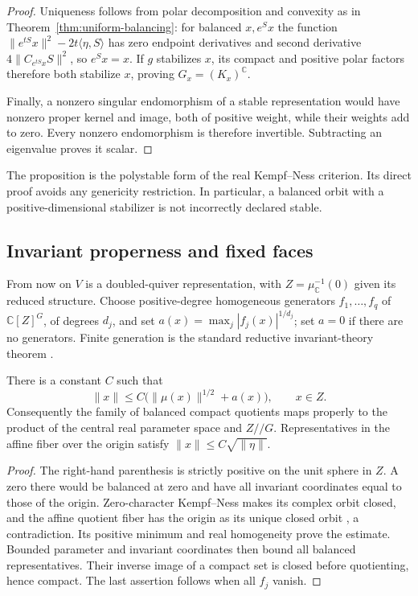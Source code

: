 \begin{proof}
Uniqueness follows from polar decomposition and convexity as in
Theorem~\ref{thm:uniform-balancing}: for balanced $x,e^Sx$ the function
$\|e^{tS}x\|^2-2t\langle\eta,S\rangle$ has zero endpoint derivatives
and second derivative $4\|C_{e^{tS}x}S\|^2$, so $e^Sx=x$.
If $g$ stabilizes $x$, its compact and positive polar factors
therefore both stabilize $x$, proving $G_x=(K_x)^{\mathbb C}$.

Finally, a nonzero singular endomorphism of a stable representation
would have nonzero proper kernel and image, both of positive weight,
while their weights add to zero. Every nonzero endomorphism is
therefore invertible. Subtracting an eigenvalue proves it scalar.
\end{proof}

The proposition is the polystable form of the real Kempf--Ness
criterion. Its direct proof avoids any genericity restriction.
In particular, a balanced orbit with a positive-dimensional stabilizer
is not incorrectly declared stable.

\subsection{Invariant properness and fixed faces}
From now on $V$ is a doubled-quiver representation, with
$Z=\mu_{\mathbb C}^{-1}(0)$ given its reduced structure.
Choose positive-degree homogeneous generators $f_1,\ldots,f_q$ of
$\mathbb C[Z]^G$, of degrees $d_j$, and set
$a(x)=\max_j|f_j(x)|^{1/d_j}$; set $a=0$ if there are no generators.
Finite generation is the standard reductive invariant-theory theorem
\cite[\S1.6]{KP96}.

\begin{lemma}\label{lem:invariant-properness}
There is a constant $C$ such that
\begin{equation}\label{eq:invariant-properness}
 \|x\|\le C\bigl(\|\mu(x)\|^{1/2}+a(x)\bigr),\qquad x\in Z.
\end{equation}
Consequently the family of balanced compact quotients maps properly
to the product of the central real parameter space and $Z/\!/G$.
Representatives in the affine fiber over the origin satisfy
$\|x\|\le C\sqrt{\|\eta\|}$.
\end{lemma}
\begin{proof}
The right-hand parenthesis is strictly positive on the unit sphere
in $Z$. A zero there would be balanced at zero and have all invariant
coordinates equal to those of the origin. Zero-character Kempf--Ness
makes its complex orbit closed, and the affine quotient fiber has
the origin as its unique closed orbit
\cite[\S2 and Theorem~6.1]{King94}, a contradiction.
Its positive minimum and real homogeneity prove the estimate.
Bounded parameter and invariant coordinates then bound all balanced
representatives. Their inverse image of a compact set is closed
before quotienting, hence compact. The last assertion follows when
all $f_j$ vanish.
\end{proof}


